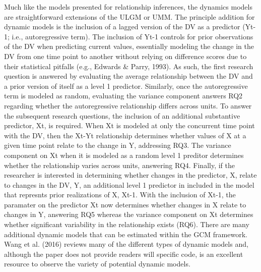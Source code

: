 \documentclass[english,,man]{apa6}
\theoremstyle{definition}
\theoremstyle{definition}
\theoremstyle{definition}
\theoremstyle{remark}
\begin{document}
Much like the models presented for relationship inferences, the dynamics
models are straightforward extensions of the ULGM or UMM. The principle
addition for dynamic models is the inclusion of a lagged version of the
DV as a predictor (Yt-1; i.e., autoregressive term). The inclusion of
Yt-1 controls for prior observations of the DV when predicting current
values, essentially modeling the change in the DV from one time point to
another without relying on difference scores due to their statistical
pitfalls (e.g., Edwards \& Parry, 1993). As such, the first research
question is answered by evaluating the average relationship between the
DV and a prior version of itself as a level 1 predictor. Similarly, once
the autoregressive term is modeled as random, evaluating the variance
component answers RQ2 regarding whether the autoregressive relationship
differs across units. To answer the subsequent research questions, the
inclusion of an additional substantive predictor, Xt, is required. When
Xt is modeled at only the concurrent time point with the DV, then the
Xt-Yt relationship determines whether values of X at a given time point
relate to the change in Y, addressing RQ3. The variance component on Xt
when it is modeled as a random level 1 preditor determines whether the
relationship varies across units, answering RQ4. Finally, if the
researcher is interested in determining whether changes in the
predictor, X, relate to changes in the DV, Y, an additional level 1
predictor in included in the model that represnts prior realizations of
X, Xt-1. With the inclusion of Xt-1, the paramater on the predictor Xt
now determines whether changes in X relate to changes in Y, answering
RQ5 whereas the variance component on Xt determines whether significant
variability in the relationship exists (RQ6). There are many additional
dynamic models that can be estimated within the GCM framework. Wang et
al. (2016) reviews many of the different types of dynamic models and,
although the paper does not provide readers will specific code, is an
excellent resource to observe the variety of potential dynamic models.
\end{document}
